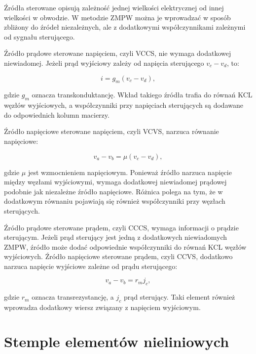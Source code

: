 Źródła sterowane opisują zależność jednej wielkości elektrycznej od innej wielkości w obwodzie. W metodzie ZMPW można je wprowadzać w sposób zbliżony do źródeł niezależnych, ale z dodatkowymi współczynnikami zależnymi od sygnału sterującego.

Źródło prądowe sterowane napięciem, czyli VCCS, nie wymaga dodatkowej niewiadomej. Jeżeli prąd wyjściowy zależy od napięcia sterującego \(v_c - v_d\), to:

\begin{equation}
\label{eq:vccs}
i = g_m(v_c - v_d),
\end{equation}

gdzie \(g_m\) oznacza transkonduktancję. Wkład takiego źródła trafia do równań KCL węzłów wyjściowych, a współczynniki przy napięciach sterujących są dodawane do odpowiednich kolumn macierzy.

Źródło napięciowe sterowane napięciem, czyli VCVS, narzuca równanie napięciowe:

\begin{equation}
\label{eq:vcvs}
v_a - v_b = \mu(v_c - v_d),
\end{equation}

gdzie \(\mu\) jest wzmocnieniem napięciowym. Ponieważ źródło narzuca napięcie między węzłami wyjściowymi, wymaga dodatkowej niewiadomej prądowej podobnie jak niezależne źródło napięciowe. Różnica polega na tym, że w dodatkowym równaniu pojawiają się również współczynniki przy węzłach sterujących.

Źródło prądowe sterowane prądem, czyli CCCS, wymaga informacji o prądzie sterującym. Jeżeli prąd sterujący jest jedną z dodatkowych niewiadomych ZMPW, źródło może dodać odpowiednie współczynniki do równań KCL węzłów wyjściowych. Źródło napięciowe sterowane prądem, czyli CCVS, dodatkowo narzuca napięcie wyjściowe zależne od prądu sterującego:

\begin{equation}
\label{eq:ccvs}
v_a - v_b = r_m j_c,
\end{equation}

gdzie \(r_m\) oznacza transrezystancję, a \(j_c\) prąd sterujący. Taki element również wprowadza dodatkowy wiersz związany z napięciem wyjściowym.

\section{Stemple elementów nieliniowych}
\label{sec:stemple-elementow-nieliniowych}

